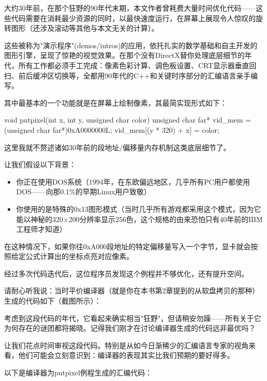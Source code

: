 
大约30年前，在那个狂野的90年代末期，本文作者曾耗费大量时间优化代码——这些代码需要在消耗最少资源的同时，以最快速度运行，在屏幕上展现令人惊叹的旋转图形（还涉及滚动等其他与本文无关的计算）。

这些被称为"演示程序"(demos/intros)的应用，依托扎实的数学基础和自主开发的图形引擎，呈现了惊艳的视觉效果。在那个没有DirectX替你处理底层细节的年代，所有工作都必须手工完成：像素色彩计算、调色板设置、CRT显示器垂直回扫、前后缓冲区切换等，全都用90年代的C++和关键时序部分的汇编语言亲手编写。

其中最基本的一个功能就是在屏幕上绘制像素，其最简实现形式如下：

\begin{cpp}
void putpixel(int x, int y, unsigned char color) {
  unsigned char far* vid_mem = (unsigned char far*)0xA0000000L;
  vid_mem[(y * 320) + x] = color;
}
\end{cpp}

这里我就不赘述诸如30年前的段地址/偏移量内存机制这类底层细节了。

让我们假设以下背景：

\begin{itemize}
\item 
你正在使用DOS系统（1994年，在东欧偏远地区，几乎所有PC用户都使用DOS——向那0.1\%的早期Linux用户致敬）

\item 
你使用的是特殊的0x13图形模式（当时几乎所有游戏都采用这个模式，因为它能以神秘的320×200分辨率显示256色，这个规格的由来恐怕只有40年前的IBM工程师才知道）
\end{itemize}

在这种情况下，如果你往0xA000段地址的特定偏移量写入一个字节，显卡就会按照给定公式计算出的坐标点亮对应像素。

经过多次代码迭代后，这位程序员发现这个例程并不够优化，还有提升空间。

请耐心听我说：当时平价编译器（就是你在本书第2章提到的从软盘拷贝的那种）生成的代码如下（截图所示）：


考虑到这段代码的年代，它看起来确实相当"狂野"，但请稍安勿躁——所有关于它为何存在的谜团都将揭晓。记得我们刚才在讨论编译器生成的代码远非最优吗？

让我们花点时间审视这段代码。特别是从如今日渐稀少的汇编语言专家的视角来看，他们可能会立刻意识到：编译器的表现其实比我们预期的要好得多。

以下是编译器为putpixel例程生成的汇编代码：

